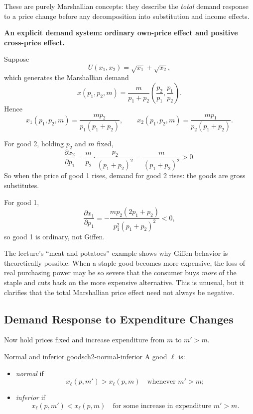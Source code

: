 These are purely Marshallian concepts: they describe the \emph{total} demand response to a price change before any decomposition into substitution and income effects.

\begin{examplebox}
\textbf{An explicit demand system: ordinary own-price effect and positive cross-price effect.}

Suppose
\[
U(x_1,x_2)=\sqrt{x_1}+\sqrt{x_2},
\]
which generates the Marshallian demand
\[
x(p_1,p_2,m)
=
\frac{m}{p_1+p_2}
\left(
\frac{p_2}{p_1},
\frac{p_1}{p_2}
\right).
\]
Hence
\[
x_1(p_1,p_2,m)=\frac{m p_2}{p_1(p_1+p_2)},
\qquad
x_2(p_1,p_2,m)=\frac{m p_1}{p_2(p_1+p_2)}.
\]

For good 2, holding $p_2$ and $m$ fixed,
\[
\frac{\partial x_2}{\partial p_1}
=
\frac{m}{p_2}\cdot \frac{p_2}{(p_1+p_2)^2}
=
\frac{m}{(p_1+p_2)^2}
>0.
\]
So when the price of good 1 rises, demand for good 2 rises: the goods are gross substitutes.

For good 1,
\[
\frac{\partial x_1}{\partial p_1}
=
-\frac{m p_2(2p_1+p_2)}{p_1^2(p_1+p_2)^2}
<0,
\]
so good 1 is ordinary, not Giffen.
\end{examplebox}

\begin{policynote}
The lecture's ``meat and potatoes'' example shows why Giffen behavior is theoretically possible. When a staple good becomes more expensive, the loss of real purchasing power may be so severe that the consumer buys \emph{more} of the staple and cuts back on the more expensive alternative. This is unusual, but it clarifies that the total Marshallian price effect need not always be negative.
\end{policynote}

\subsection{Demand Response to Expenditure Changes}

Now hold prices fixed and increase expenditure from $m$ to $m' > m$.

\begin{definition}{Normal and inferior goods}{ch2-normal-inferior}
A good $\ell$ is:
\begin{itemize}
    \item \emph{normal} if
    \[
    x_\ell(p,m') > x_\ell(p,m)
    \quad \text{whenever } m' > m;
    \]
    \item \emph{inferior} if
    \[
    x_\ell(p,m') < x_\ell(p,m)
    \quad \text{for some increase in expenditure } m' > m.
    \]
\end{itemize}
\end{definition}

